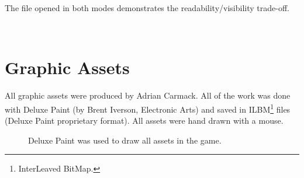 \documentclass[book.tex]{subfiles}
\begin{document}
\bigskip
 The file  opened in both modes demonstrates the readability/visibility trade-off.\\
\par

  \\
\vspace{-5pt}  
\par
\vspace{5pt}
\section{Graphic Assets}
\label{section:graphic_assets}

All graphic assets were produced by Adrian Carmack. All of the work was done with Deluxe Paint (by Brent Iverson, Electronic Arts) and saved in ILBM\footnote{InterLeaved BitMap.} files (Deluxe Paint proprietary format). All assets were hand drawn with a mouse.

\begin{figure}[H]
  \centering
 \caption{Deluxe Paint was used to draw all assets in the game.}
\end{figure}
\end{document}
